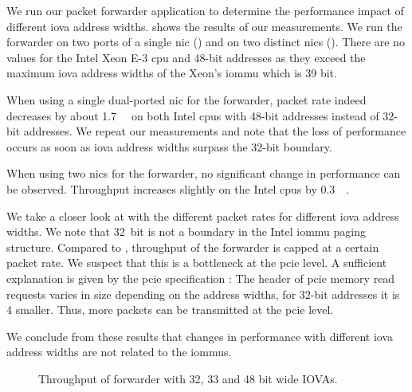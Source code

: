 We run our packet forwarder application to determine the performance impact of
different \ac{iova} address widths. 
shows the results of our measurements. We run the forwarder on two ports of a
single \ac{nic} () and on
two distinct \acp{nic} ().
There are no values for the Intel Xeon E-3 \ac{cpu} and 48-bit addresses as they
exceed the maximum \ac{iova} address widths of the Xeon's \ac{iommu} which is 39
bit.

When using a single dual-ported \ac{nic} for the forwarder, packet rate indeed
decreases by about \SI{1.7}{\mega\pps} on both Intel \acp{cpu} with 48-bit
addresses instead of 32-bit addresses. We repeat our measurements and note that
the loss of performance occurs as soon as \ac{iova} address widths surpass the
32-bit boundary.

When using two \acp{nic} for the forwarder, no significant change in performance
can be observed. Throughput increases slightly on the Intel \acp{cpu} by
\SI{0.3}{\mega\pps}.

We take a closer look at 
with the different packet rates for different \ac{iova} address widths. We note
that 32~bit is not a boundary in the Intel \ac{iommu} paging structure. Compared
to , throughput of the
forwarder is capped at a certain packet rate. We suspect that this is a
bottleneck at the \ac{pcie} level. A sufficient explanation is given by the
\ac{pcie} specification \cite{pcie2017specification}: The header of \ac{pcie}
memory read requests varies in size depending on the address widths, for 32-bit
addresses it is \SI{4}{\byte} smaller. Thus, more packets can be transmitted at
the \ac{pcie} level.

We conclude from these results that changes in performance with different
\ac{iova} address widths are not related to the \acp{iommu}.

\begin{figure}%
    \centering

    \caption{Throughput of forwarder with 32, 33 and 48 bit wide IOVAs.}
    \label{fig:iova-address-widths-throughput}
\end{figure}


